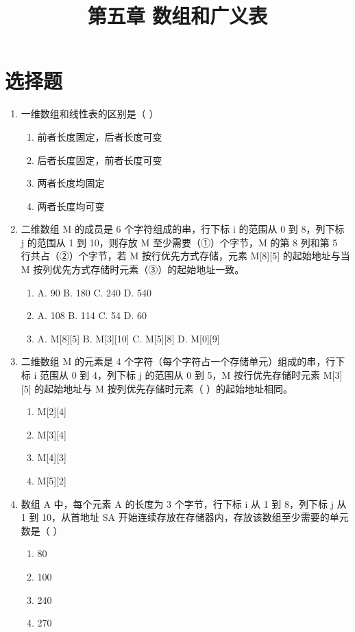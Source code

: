 \documentclass[12pt, a4paper]{article}
\title{\textbf{第五章 数组和广义表}}
\author{}
\date{}
\begin{document}
\section*{选择题}

\begin{enumerate}[label=\arabic*.]
	\item 一维数组和线性表的区别是（ ）
	      \begin{enumerate}
		      \item[A.] 前者长度固定，后者长度可变
		      \item[B.] 后者长度固定，前者长度可变
		      \item[C.] 两者长度均固定
		      \item[D.] 两者长度均可变
	      \end{enumerate}

	\item 二维数组 M 的成员是 6 个字符组成的串，行下标 i 的范围从 0 到 8，列下标 j 的范围从 1 到 10，则存放 M 至少需要（①）个字节，M 的第 8 列和第 5 行共占（②）个字节，若 M 按行优先方式存储，元素 M[8][5] 的起始地址与当 M 按列优先方式存储时元素（③）的起始地址一致。
	      \begin{enumerate}
		      \item[①] A. 90 \quad B. 180 \quad C. 240 \quad D. 540
		      \item[②] A. 108 \quad B. 114 \quad C. 54 \quad D. 60
		      \item[③] A. M[8][5] \quad B. M[3][10] \quad C. M[5][8] \quad D. M[0][9]
	      \end{enumerate}

	\item 二维数组 M 的元素是 4 个字符（每个字符占一个存储单元）组成的串，行下标 i 范围从 0 到 4，列下标 j 的范围从 0 到 5，M 按行优先存储时元素 M[3][5] 的起始地址与 M 按列优先存储时元素（ ）的起始地址相同。
	      \begin{enumerate}
		      \item[A.] M[2][4]
		      \item[B.] M[3][4]
		      \item[C.] M[4][3]
		      \item[D.] M[5][2]
	      \end{enumerate}

	\item 数组 A 中，每个元素 A 的长度为 3 个字节，行下标 i 从 1 到 8，列下标 j 从 1 到 10，从首地址 SA 开始连续存放在存储器内，存放该数组至少需要的单元数是（ ）
	      \begin{enumerate}
		      \item[A.] 80
		      \item[B.] 100
		      \item[C.] 240
		      \item[D.] 270
	      \end{enumerate}


\end{enumerate}
\end{document}
